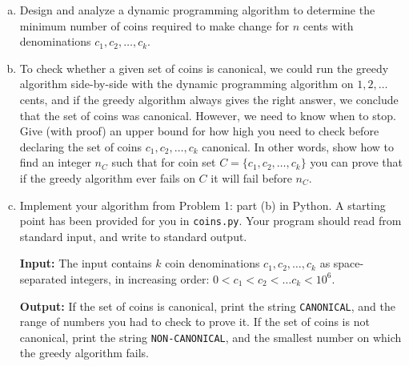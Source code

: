 \documentclass[11pt]{article}
\begin{document}
\begin{enumerate}[(a)]

\item
Design and analyze a dynamic programming algorithm to determine the minimum number of coins required to make change for $n$ cents with denominations $c_1, c_2, \ldots, c_k$.

\hspace{-10mm}

\item
To check whether a given set of coins is canonical, we could run the greedy algorithm side-by-side with the dynamic programming algorithm on $1, 2, \ldots$ cents, and if the greedy algorithm always gives the right answer, we conclude that the set of coins was canonical.
However, we need to know when to stop.
Give (with proof) an upper bound for how high you need to check before declaring the set of coins $c_1, c_2, \ldots, c_k$ canonical.
In other words, show how to find an integer $n_C$ such that for coin set $C = \{c_1, c_2, \ldots, c_k\}$ you can prove that if the greedy algorithm ever fails on $C$ it will fail before $n_C$.

\hspace{-10mm}

\item
Implement your algorithm from Problem 1: part (b) in Python.
A starting point has been provided for you in \texttt{coins.py}.
Your program should read from standard input, and write to standard output.

\vspace{\baselineskip}
\textbf{Input:}
The input contains $k$ coin denominations $c_1, c_2, \ldots, c_k$ as space-separated integers, in increasing order: $0 < c_1 < c_2 < \ldots c_k < 10^6$.

\vspace{\baselineskip}
  \textbf{Output:}
  If the set of coins is canonical, print the string \texttt{CANONICAL}, and the range of numbers you had to check to prove it.
  If the set of coins is not canonical, print the string \texttt{NON-CANONICAL}, and the smallest number on which the greedy algorithm fails.


\end{enumerate}
\end{document}

